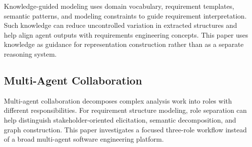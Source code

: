 Knowledge-guided modeling uses domain vocabulary, requirement templates, semantic patterns, and modeling constraints to guide requirement interpretation.
Such knowledge can reduce uncontrolled variation in extracted structures and help align agent outputs with requirements engineering concepts.
This paper uses knowledge as guidance for representation construction rather than as a separate reasoning system.

\subsection{Multi-Agent Collaboration}
\label{sec:rw-multi-agent}

Multi-agent collaboration decomposes complex analysis work into roles with different responsibilities.
For requirement structure modeling, role separation can help distinguish stakeholder-oriented elicitation, semantic decomposition, and graph construction.
This paper investigates a focused three-role workflow instead of a broad multi-agent software engineering platform.
